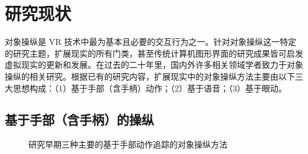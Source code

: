 \chapter{研究现状}

对象操纵是 VR 技术中最为基本且必要的交互行为之一。针对对象操纵这一特定的研究主题，扩展现实的所有门类，甚至传统计算机图形界面的研究成果皆可启发虚拟现实的更新和发展。在过去的二十年里，国内外许多相关领域学者致力于对象操纵的相关研究。根据已有的研究内容，扩展现实中的对象操纵方法主要由以下三大思想构成：（1）基于手部（含手柄）动作；（2）基于语音；（3）基于眼动。

\section{基于手部（含手柄）的操纵}

\begin{figure}[b!]
    \centering
    \hspace{2em} %
    \hspace{2em} %
    \caption{研究早期三种主要的基于手部动作追踪的对象操纵方法}
    \label{fig-1}
\end{figure}

